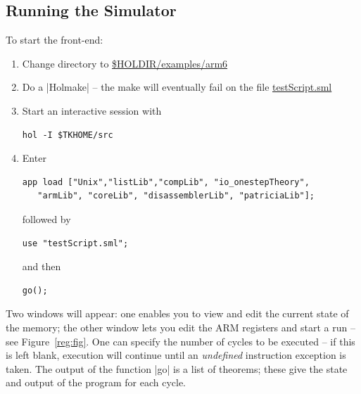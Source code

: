 \documentclass[12pt]{article}
\newcommand{\F}{Figure~}
\begin{document}

\subsection*{Running the Simulator}

To start the front-end:
\begin{enumerate}
\item Change directory to \url{$HOLDIR/examples/arm6}
\item Do a |Holmake| -- the make will eventually fail on the file \url{testScript.sml}
\item Start an interactive session with
\begin{Verbatim}
hol -I $TKHOME/src
\end{Verbatim}
\item Enter
\begin{Verbatim}
app load ["Unix","listLib","compLib", "io_onestepTheory",
   "armLib", "coreLib", "disassemblerLib", "patriciaLib"];
\end{Verbatim}
followed by
\begin{Verbatim}
use "testScript.sml";
\end{Verbatim}
and then
\begin{Verbatim}
go();
\end{Verbatim}
\end{enumerate}
Two windows will appear: one enables you to view and edit the current state of the memory; the other window lets you edit the ARM registers and start a run -- see \F\ref{reg:fig}.   One can specify the number of cycles to be executed -- if this is left blank, execution will continue until an \emph{undefined} instruction exception is taken.  The output of the function |go| is a list of theorems; these give the state and output of the program for each cycle.
\end{document}
